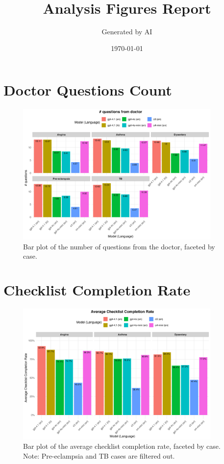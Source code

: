 \documentclass{article}
\title{Analysis Figures Report}
\author{Generated by AI}
\date{\today}
\begin{document}
\maketitle
\newpage

\section{Doctor Questions Count}
\begin{figure}[h!]
    \centering
    \includegraphics[width=0.9\textwidth]{figs/doctor_questions_count_plot.png}
    \caption{Bar plot of the number of questions from the doctor, faceted by case.}
    \label{fig:doc_questions}
\end{figure}
\newpage

\section{Checklist Completion Rate}
\begin{figure}[h!]
    \centering
    \includegraphics[width=0.9\textwidth]{figs/checklist_completion_rate_plot.png}
    \caption{Bar plot of the average checklist completion rate, faceted by case. Note: Pre-eclampsia and TB cases are filtered out.}
    \label{fig:checklist_completion}
\end{figure}
\newpage
\end{document}

